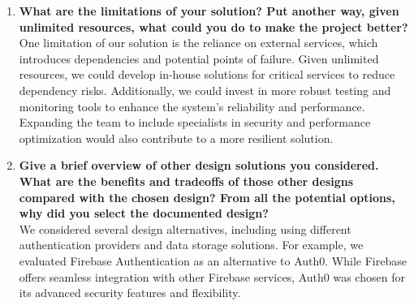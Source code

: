 \documentclass[12pt, titlepage]{article}
\begin{document}
\begin{enumerate}
  \item \textbf{What are the limitations of your solution? Put another way, given unlimited resources, what could you do to make the project better?}  \\
  One limitation of our solution is the reliance on external services, which introduces dependencies and potential points of failure. Given unlimited resources, we could develop in-house solutions for critical services to reduce dependency risks. Additionally, we could invest in more robust testing and monitoring tools to enhance the system's reliability and performance. Expanding the team to include specialists in security and performance optimization would also contribute to a more resilient solution.

  \item \textbf{Give a brief overview of other design solutions you considered. What are the benefits and tradeoffs of those other designs compared with the chosen design? From all the potential options, why did you select the documented design?}  \\
  We considered several design alternatives, including using different authentication providers and data storage solutions. For example, we evaluated Firebase Authentication as an alternative to Auth0. While Firebase offers seamless integration with other Firebase services, Auth0 was chosen for its advanced security features and flexibility.
\end{enumerate}
\end{document}
